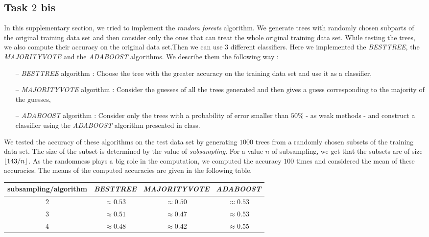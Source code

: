 \documentclass[9pt]{extarticle}
\DeclarePairedDelimiter\floor{\lfloor}{\rfloor}
\begin{document}
\subsection{Task $2$ bis}
	In this supplementary section, we tried to implement the \emph{random forests} algorithm. We generate trees with randomly chosen subparts of the original training data set and then consider only the ones that can treat the whole original training data set. While testing the trees, we also compute their accuracy on the original data set.Then we can use $3$ different classifiers. Here we implemented the \emph{BESTTREE}, the \emph{MAJORITYVOTE} and the \emph{ADABOOST} algorithms. We describe them the following way :
	\begin{itemize}[topsep=0pt,itemsep=0pt,partopsep=0pt, parsep=0pt]
		\item[--] \emph{BESTTREE} algorithm : Choose the tree with the greater accuracy on the training data set and use it as a classifier,
		\item[--] \emph{MAJORITYVOTE} algorithm : Consider the guesses of all the trees generated and then gives a guess corresponding to the majority of the guesses,
		\item[--] \emph{ADABOOST} algorithm : Consider only the trees with a probability of error smaller than $50\%$  - as weak methods - and construct a classifier using the \emph{ADABOOST} algorithm presented in class.
	\end{itemize}
	We tested the accuracy of these algorithms on the test data set by generating $1000$ trees from a randomly chosen subsets of the training data set. The size of the subset is determined by the value of \emph{subsampling}. For a value $n$ of subsampling, we get that the subsets are of size $\floor{143/n}$. As the randomness plays a big role in the computation, we computed the accuracy $100$ times and considered the mean of these accuracies. The means of the computed accuracies are given in the following table.
	\begin{center}
		\begin{tabular}{ |c|c|c|c| }
			\hline
			subsampling/algorithm& \emph{BESTTREE} & \emph{MAJORITYVOTE} & \emph{ADABOOST}\\
			\hline
			2 & $\approx 0.53$  & $\approx 0.50$ & $\approx 0.53$ \\
			\hline
			3 & $\approx 0.51 $ & $\approx 0.47$ & $\approx 0.53$ \\
			\hline
			4 & $\approx 0.48$ & $\approx 0.42$ & $\approx 0.55$\\
			\hline
		\end{tabular}
	\end{center}
\end{document}

